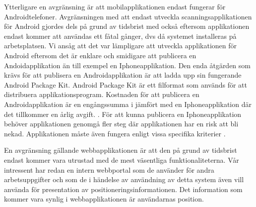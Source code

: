 \documentclass[a4paper,12pt]{article}
\begin{document}
 Ytterligare en avgränsning är att mobilapplikationen endast fungerar för Androidtelefoner.
 Avgränsningen med att endast utveckla scanningsapplikationen för Android gjordes dels på grund av tidsbrist med också eftersom applikationen endast kommer att användas ett fåtal gånger, dvs då systemet installeras på arbetsplatsen. Vi ansåg att det var lämpligare att utveckla applikationen för Android eftersom det är enklare och smidigare att publicera en Andoidapplikation än till exempel en Iphoneapplikation. Den enda åtgärden som krävs för att publisera en Androidapplikation är att ladda upp sin fungerande Android Package Kit. Android Package Kit är ett filformat som används för att distribuera applikationsprogram. Kostnaden för att publicera en Androidapplikation är en engångssumma i jämfört med en Iphoneapplikation där det tillkommer en årlig avgift. \cite{android} \cite{guidePublish}. För att kunna publicera en Iphoneapplikation behöver applikationen genomgå fler steg där applikationen har en risk att bli nekad. Applikationen måste även fungera enligt vissa specifika kriterier \cite{submitIphone} \cite{guidePublish}.

 En avgränsning gällande webbapplikationen är att den på grund av tidsbrist endast kommer vara utrustad med de mest väsentliga funktionaliteterna. Vår intressent har redan en intern webbportal som de använder för andra arbetsuppgifter och som de i händelse av användning av detta system även vill använda för presentation av positioneringsinformationen. Det information som kommer vara synlig i webbapplikationen är användarnas position.

\end{document}
